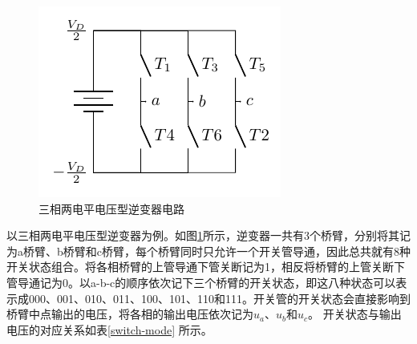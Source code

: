 \documentclass{ctexart}
\numberwithin{equation}{section}
\begin{document}
\begin{figure}[hbtp]
  \centering
  \includegraphics[width = .5\linewidth ]{three-phase-converter.pdf}
  \caption{三相两电平电压型逆变器电路}
  \label{three-phase-converter}
\end{figure}  

以三相两电平电压型逆变器为例。如图\ref{three-phase-converter}所示，逆变器一共有3个桥臂，分别将其记为a桥臂、b桥臂和c桥臂，每个桥臂同时只允许一个开关管导通，因此总共就有8种开关状态组合。将各相桥臂的上管导通下管关断记为1，相反将桥臂的上管关断下管导通记为0。以a-b-c的顺序依次记下三个桥臂的开关状态，即这八种状态可以表示成000、001、010、011、100、101、110和111。开关管的开关状态会直接影响到桥臂中点输出的电压，将各相的输出电压依次记为$u_a$、$u_b$和$u_c$。
开关状态与输出电压的对应关系如表\ref{switch-mode} 所示。
\end{document}
